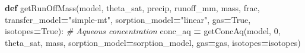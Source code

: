 \documentclass[]{article}
\newenvironment{Shaded}{\begin{snugshade}}{\end{snugshade}}
\newcommand{\KeywordTok}[1]{\textcolor[rgb]{0.13,0.29,0.53}{\textbf{{#1}}}}
\newcommand{\DecValTok}[1]{\textcolor[rgb]{0.00,0.00,0.81}{{#1}}}
\newcommand{\StringTok}[1]{\textcolor[rgb]{0.31,0.60,0.02}{{#1}}}
\newcommand{\CommentTok}[1]{\textcolor[rgb]{0.56,0.35,0.01}{\textit{{#1}}}}
\newcommand{\VariableTok}[1]{\textcolor[rgb]{0.00,0.00,0.00}{{#1}}}
\newcommand{\OperatorTok}[1]{\textcolor[rgb]{0.81,0.36,0.00}{\textbf{{#1}}}}
\newcommand{\NormalTok}[1]{{#1}}
\begin{document}
\begin{Shaded}
\begin{Highlighting}[]
\KeywordTok{def} \NormalTok{getRunOffMass(model, theta_sat, precip, runoff_mm,}
                  \NormalTok{mass, frac,}
                  \NormalTok{transfer_model}\OperatorTok{=}\StringTok{"simple-mt"}\NormalTok{, sorption_model}\OperatorTok{=}\StringTok{"linear"}\NormalTok{,}
                  \NormalTok{gas}\OperatorTok{=}\VariableTok{True}\NormalTok{, isotopes}\OperatorTok{=}\VariableTok{True}\NormalTok{):}
    \CommentTok{# Aqueous concentration}
    \NormalTok{conc_aq }\OperatorTok{=} \NormalTok{getConcAq(model, }\DecValTok{0}\NormalTok{, theta_sat, mass,}
                        \NormalTok{sorption_model}\OperatorTok{=}\NormalTok{sorption_model, gas}\OperatorTok{=}\NormalTok{gas, isotopes}\OperatorTok{=}\NormalTok{isotopes)}


\end{Highlighting}
\end{Shaded}
\end{document}
